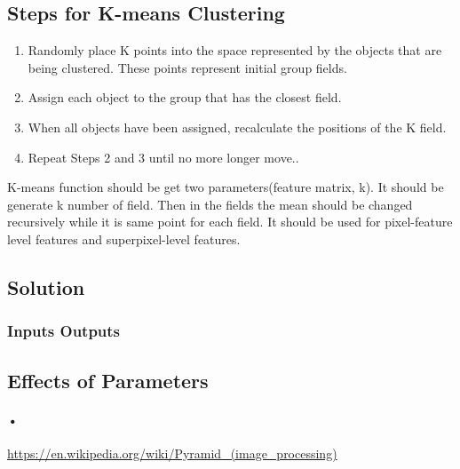 \documentclass[12pt]{article}
\begin{document}
\subsection*{Steps for K-means Clustering}
\begin{enumerate}
\item Randomly place K points into the space represented by the objects that are being clustered. These points represent initial group fields.
\item Assign each object to the group that has the closest field.
\item When all objects have been assigned, recalculate the positions of the K field.
\item Repeat Steps 2 and 3 until no more longer move..
\end{enumerate}
K-means function should be get two parameters(feature matrix, k). It should be generate k number of field. Then in the fields the mean should be changed recursively while it is same point for each field. It should be used for pixel-feature level features and superpixel-level features.
\subsection{Solution}


\subsubsection{Inputs Outputs}


\subsection{Effects of Parameters}
\paragraph{•}



  \begin{thebibliography}{1}
   \url{https://en.wikipedia.org/wiki/Pyramid_(image_processing)}
  \end{thebibliography}             
\end{document}

